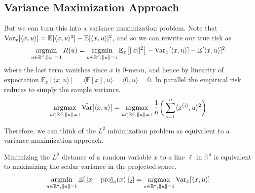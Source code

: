 \subsection{Variance Maximization Approach}

  But we can turn this into a variance maximization problem. Note that $\operatorname{Var}_x [\langle x, u \rangle] = \mathbb{E}[ \langle x, u \rangle^2 ] - \mathbb{E}[ \langle x, u \rangle]^2$, and so we can rewrite our true risk as 
  \begin{align}
    \operatorname*{\arg\!\min}_{u \in \mathbb{R}^d, \|u\|=1} R(u) = \operatorname*{\arg\!\min}_{u \in \mathbb{R}^d, \|u\|=1} \mathbb{E}_x \big[ \|x\|^2 \big] - \operatorname{Var}_x [\langle x, u \rangle] - \mathbb{E}[ \langle x, u \rangle]^2
  \end{align} 
  where the last term vanishes since $x$ is $0$-mean, and hence by linearity of expectation $\mathbb{E}_x [\langle x, u \rangle] = \langle \mathbb{E}[x], u \rangle = \langle 0, u \rangle = 0$. In parallel the empirical risk reduces to simply the sample variance. 
  \begin{equation}
    \operatorname*{\arg\!\max}_{u \in \mathbb{R}^{d}, \|u\| = 1} \hat{\operatorname{Var}}[ \langle x, u \rangle] = \operatorname*{\arg\!\max}_{u \in \mathbb{R}^{d}, \|u\| = 1} \frac{1}{n} \bigg( \sum_{i=1}^n \langle x^{(i)}, u \rangle^2 \bigg)
  \end{equation} 

  Therefore, we can think of the $L^2$ minimization problem as equivalent to a variance maximization approach.  

  \begin{lemma}
    Minimizing the $L^2$ distance of a random variable $x$ to a line $\ell$ in $\mathbb{R}^d$ is equivalent to maximizing the scalar variance in the projected space. 
    \begin{equation}
      \operatorname*{\arg\!\min}_{u \in \mathbb{R}^d, \|u\| = 1} \mathbb{E} [ \| x - \operatorname{proj}_u (x) \|_2 ] = \operatorname*{\arg\!\max}_{u \in \mathbb{R}^d, \|u\| = 1} \operatorname{Var}_x [\langle x, u \rangle ]
    \end{equation}
  \end{lemma}

